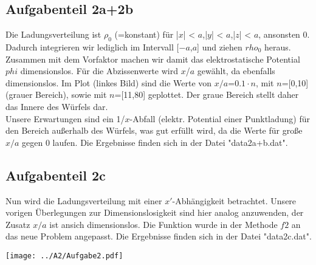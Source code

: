 \subsection*{Aufgabenteil 2a+2b}
Die Ladungsverteilung ist $\rho_0$ (=konstant) für |$x$| < $a$,|$y$| < $a$,|$z$| < $a$, ansonsten 0. Dadurch integrieren wir lediglich im Intervall [$-a$,$a$] und ziehen $rho_0$ heraus. Zusammen mit dem Vorfaktor machen wir damit das elektrostatische Potential $phi$ dimensionslos. Für die Abzissenwerte wird $x$/$a$ gewählt, da ebenfalls dimensionslos. Im Plot (linkes Bild) sind die Werte von $x/a$=$0.1\cdot n$, mit $n$=[0,10] (grauer Bereich), sowie mit $n$=[11,80] geplottet. Der graue Bereich stellt daher das Innere des Würfels dar. \\
Unsere Erwartungen sind ein 1/$x$-Abfall (elektr. Potential einer Punktladung) für den Bereich außerhalb des Würfels, was gut erfüllt wird, da die Werte für große $x/a$ gegen 0 laufen. Die Ergebnisse finden sich in der Datei "data2a+b.dat".
\subsection*{Aufgabenteil 2c}
Nun wird die Ladungsverteilung mit einer $x'$-Abhängigkeit betrachtet. Unsere vorigen Überlegungen zur Dimensionslosigkeit sind hier analog anzuwenden, der Zusatz $x/a$ ist ansich dimensionslos. Die Funktion wurde in der Methode $f2$ an das neue Problem angepasst.
Die Ergebnisse finden sich in der Datei "data2c.dat".

\begin{landscape}
\thispagestyle{empty}
\hspace{-5cm}
\texttt{[image: ../A2/Aufgabe2.pdf]}
\end{landscape}


